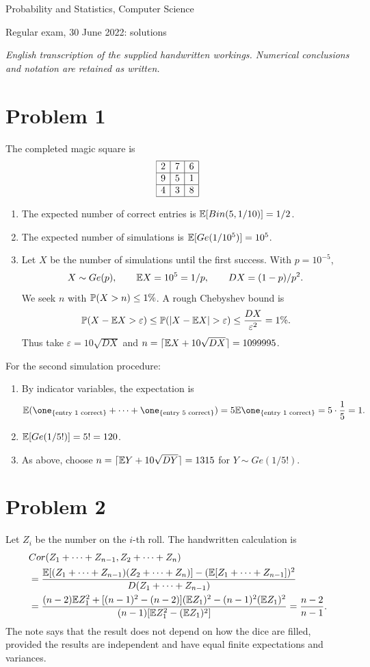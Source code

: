 \documentclass[a4paper]{article}
\begin{document}
\begin{center}\Large Probability and Statistics, Computer Science\par\large Regular exam, 30 June 2022: solutions\end{center}
\noindent\textit{English transcription of the supplied handwritten workings. Numerical conclusions and notation are retained as written.}
\section*{Problem 1}
The completed magic square is
\[\begin{array}{|c|c|c|}\hline2&7&6\\\hline9&5&1\\\hline4&3&8\\\hline\end{array}\]
\begin{enumerate}
\item The expected number of correct entries is $\E[Bin(5,1/10)]=1/2$.
\item The expected number of simulations is $\E[Ge(1/10^5)]=10^5$.
\item Let $X$ be the number of simulations until the first success. With $p=10^{-5}$,
\[X\sim Ge(p),\qquad\E X=10^5=1/p,\qquad DX=(1-p)/p^2.\]
We seek $n$ with $\P(X>n)\le1\%$. A rough Chebyshev bound is
\[\P(X-\E X>\varepsilon)\le\P(|X-\E X|>\varepsilon)\le\frac{DX}{\varepsilon^2}=1\%.\]
Thus take $\varepsilon=10\sqrt{DX}$ and $n=\lceil\E X+10\sqrt{DX}\rceil=1099995$.
\end{enumerate}
For the second simulation procedure:
\begin{enumerate}
\item By indicator variables, the expectation is
\[\E(\one_{\{\text{entry 1 correct}\}}+\cdots+\one_{\{\text{entry 5 correct}\}})=5\E\one_{\{\text{entry 1 correct}\}}=5\cdot\frac15=1.\]
\item $\E[Ge(1/5!)]=5!=120$.
\item As above, choose $n=\lceil\E Y+10\sqrt{DY}\rceil=1315$ for $Y\sim Ge(1/5!)$.
\end{enumerate}
\section*{Problem 2}
Let $Z_i$ be the number on the $i$-th roll. The handwritten calculation is
\begin{align*}
&Cor(Z_1+\cdots+Z_{n-1},Z_2+\cdots+Z_n)\\
&=\frac{\E[(Z_1+\cdots+Z_{n-1})(Z_2+\cdots+Z_n)]-(\E[Z_1+\cdots+Z_{n-1}])^2}{D(Z_1+\cdots+Z_{n-1})}\\
&=\frac{(n-2)\E Z_1^2+[(n-1)^2-(n-2)](\E Z_1)^2-(n-1)^2(\E Z_1)^2}{(n-1)[\E Z_1^2-(\E Z_1)^2]}=\frac{n-2}{n-1}.
\end{align*}
The note says that the result does not depend on how the dice are filled, provided the results are independent and have equal finite expectations and variances.
\end{document}
